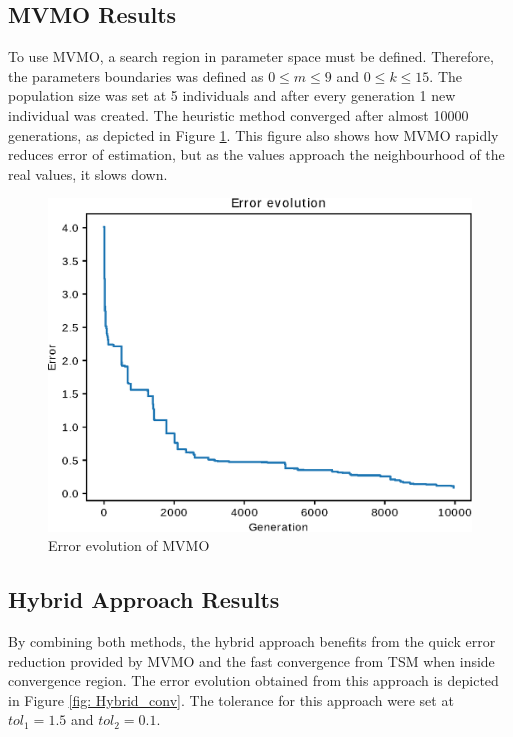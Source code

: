 \subsection{MVMO Results}

To use MVMO, a search region in parameter space must be defined. Therefore, the parameters boundaries was defined as $0 \leq m \leq 9$ and $0 \leq k \leq 15$. The population size was set at 5 individuals and after every generation 1 new individual was created. The heuristic method converged after almost 10000 generations, as depicted in Figure \ref{fig: MVMO_conv}. This figure also shows how MVMO rapidly reduces error of estimation, but as the values approach the neighbourhood of the real values, it slows down.

\begin{figure}[h]
	\caption{Error evolution of MVMO}
	\begin{center}
		\includegraphics[scale=0.7]{Images/MVMO_conv.eps}
	\end{center}
	\label{fig: MVMO_conv}
\end{figure}

\subsection{Hybrid Approach Results}

By combining both methods, the hybrid approach benefits from the quick error reduction provided by MVMO and the fast convergence from TSM when inside convergence region. The error evolution obtained from this approach is depicted in Figure \ref{fig: Hybrid_conv}. The tolerance for this approach were set at $tol_{1} = 1.5$ and $tol_{2} = 0.1$.


